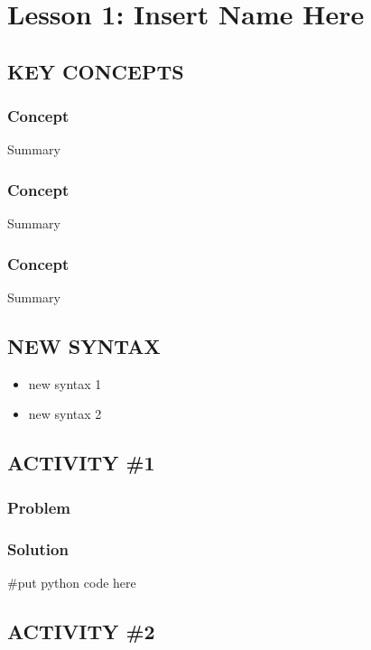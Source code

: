 \documentclass[14pt]{extreport}%
\begin{document}
\setcounter{chapter}{0}
\chapter{\Large{\textbf{Lesson 1}: Insert Name Here}}

\vspace{-10pt}

\section*{KEY CONCEPTS}
\subsection*{Concept}
Summary
\subsection*{Concept}
Summary
\subsection*{Concept}
Summary

\section*{NEW SYNTAX}
\begin{itemize}
    \item new syntax 1
    \item new syntax 2
\end{itemize}

\section*{ACTIVITY \#1} 
\subsection*{Problem}
\subsection*{Solution}
\begin{python}
#put python code here
\end{python}

\section*{ACTIVITY \#2} 
\end{document}
